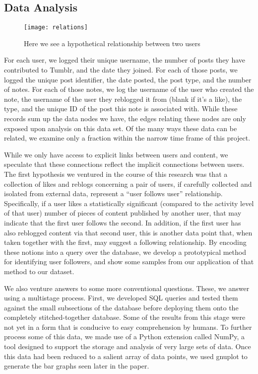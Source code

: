 \subsection{Data Analysis}
\begin{figure*}
\centering
\texttt{[image: relations]}
 \caption{Here we see a hypothetical relationship between two users}
 \label{fig:relations}
\end{figure*}
For each user, we logged their unique username, the number of posts 
they have contributed to Tumblr, and the date they joined. 
For each of those posts, we logged the unique post identifier, the 
date posted, the post type, and the number of notes.
For each of those notes, we log the username of the user who created 
the note, the username of the user they reblogged it from (blank if 
it's a like), the type, and the unique ID of the post this note is 
associated with.  While these records sum up the data nodes we have, 
the edges relating these nodes are only exposed upon analysis on this 
data set.  Of the many ways these data can be related, we examine only 
a fraction within the narrow time frame of this project.

While we only have access to explicit links between users and content, 
we speculate that these connections reflect the implicit connections 
between users.  The first hypothesis we ventured in the course of this 
research was that a collection of likes and reblogs concerning a pair 
of users, if carefully collected and isolated from external data, 
represent a ``user follows user'' relationship.  Specifically, if a 
user likes a statistically significant (compared to the activity level 
of that user) number of pieces of content published by another user, 
that may indicate that the first user follows the second.  In addition, 
if the first user has also reblogged content via that second user, this 
is another data point that, when taken together with the first, may 
suggest a following relationship.  By encoding these notions into a 
query over the database, we develop a prototypical method for 
identifying user followers, and show some samples from our application 
of that method to our dataset.


We also venture answers to some more conventional questions.  These, 
we answer using a multistage process.  First, we developed SQL queries 
and tested them against the small subsections of the database before 
deploying them onto the completely stitched-together database.  Some 
of the results from this stage were not yet in a form that is conducive 
to easy comprehension by humans.  To further process some of this data, 
we made use of a Python extension called NumPy, a tool designed to 
support the storage and analysis of very large sets of data.  Once 
this data had been reduced to a salient array of data points, we used 
gnuplot to generate the bar graphs seen later in the paper.


